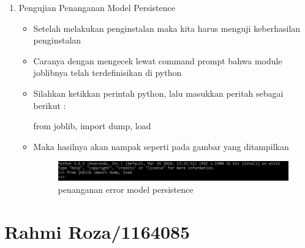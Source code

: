 \begin{itemize}
\begin{enumerate}
\begin{itemize}
\par
\end{itemize}
\end{enumerate}

\par
\begin{enumerate}
\item Pengujian Penanganan Model Persistence
\begin{itemize}
\item Setelah melakukan penginstalan maka kita harus menguji keberhasilan penginstalan
\item Caranya dengan mengecek lewat command prompt bahwa module joblibnya telah terdefinisikan di python
\item Silahkan ketikkan perintah python, lalu masukkan peritah sebagai berikut :
\par from joblib, import dump, load
\par
\item Maka hasilnya akan nampak seperti pada gambar yang ditampilkan

\begin{figure}[ht]
\centering
\includegraphics[scale=0.5]{figures/penanganan2.jpg}
\caption{penanganan error model persistence }
\label{contoh}
\end{figure}

\par
\end{itemize}
\end{enumerate}



\section{Rahmi Roza/1164085}

\end{itemize}

